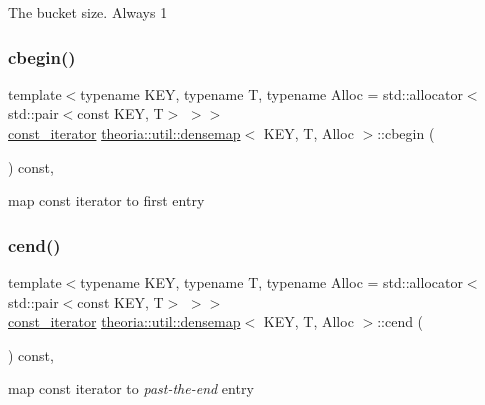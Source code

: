 The bucket size. Always 1 \mbox{\label{classtheoria_1_1util_1_1densemap_a519f986513c0242d89cb97a36b587743}} 
\subsubsection{\texorpdfstring{cbegin()}{cbegin()}}
{\footnotesize\ttfamily template$<$typename K\+EY, typename T, typename Alloc = std\+::allocator$<$std\+::pair$<$const K\+E\+Y, T$>$ $>$$>$ \\
\hyperlink{classtheoria_1_1util_1_1densemap_a8c2937f8e4ba47abf344d9f9f23f0c88}{const\+\_\+iterator} \hyperlink{classtheoria_1_1util_1_1densemap}{theoria\+::util\+::densemap}$<$ K\+EY, T, Alloc $>$\+::cbegin (\begin{DoxyParamCaption}{ }\end{DoxyParamCaption}) const\hspace{0.3cm}{\ttfamily [inline]}, {\ttfamily [noexcept]}}

map const iterator to first entry \mbox{\label{classtheoria_1_1util_1_1densemap_a01965a6fe934583b09cb0812e673d64c}} 
\subsubsection{\texorpdfstring{cend()}{cend()}}
{\footnotesize\ttfamily template$<$typename K\+EY, typename T, typename Alloc = std\+::allocator$<$std\+::pair$<$const K\+E\+Y, T$>$ $>$$>$ \\
\hyperlink{classtheoria_1_1util_1_1densemap_a8c2937f8e4ba47abf344d9f9f23f0c88}{const\+\_\+iterator} \hyperlink{classtheoria_1_1util_1_1densemap}{theoria\+::util\+::densemap}$<$ K\+EY, T, Alloc $>$\+::cend (\begin{DoxyParamCaption}{ }\end{DoxyParamCaption}) const\hspace{0.3cm}{\ttfamily [inline]}, {\ttfamily [noexcept]}}

map const iterator to {\itshape past-\/the-\/end} entry \mbox{\label{classtheoria_1_1util_1_1densemap_ae087d2be9f5947d79522f6a3b592786e}} 
